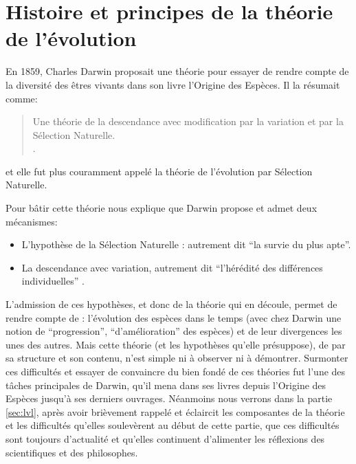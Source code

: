 

\section{Histoire et principes de la théorie de l'évolution}\label{sec:cmpdr}

En 1859, Charles Darwin proposait une théorie pour essayer de rendre compte de la diversité des êtres vivants dans son livre l'Origine des Espèces\nocite{darwin1859originspeciesbymeansnaturalselectionorpreservationfavouredracesstrugglelife}. Il la résumait comme:
\begin{quote}
	Une théorie de la descendance avec modification par la variation et par la Sélection Naturelle.\\
	\cite[dernière édition, trad. \cite{gayon1991darwinetlapresdarwin}]{darwin1859originspeciesbymeansnaturalselectionorpreservationfavouredracesstrugglelife}.
\end{quote}
et elle fut plus couramment appelé la théorie de l'évolution par Sélection Naturelle.

Pour bâtir cette théorie \cite{gayon1991darwinetlapresdarwin} nous explique que Darwin propose et admet deux mécanismes:
\begin{itemize}
	\item L'hypothèse de la Sélection Naturelle : autrement dit ``la survie du plus apte''.
	\item La descendance avec variation, autrement dit ``l'hérédité des différences individuelles'' \citep{gayon1991darwinetlapresdarwin}.
\end{itemize}

L'admission de ces hypothèses, et donc de la théorie qui en découle, permet de rendre compte de : l'évolution des espèces dans le temps (avec chez Darwin une notion de ``progression'', ``d'amélioration'' des espèces) et de leur divergences les unes des autres. Mais cette théorie (et les hypothèses qu'elle présuppose), de par sa structure et son contenu, n'est simple ni à observer ni à démontrer. Surmonter ces difficultés et essayer de convaincre du bien fondé de ces théories fut l'une des tâches principales de Darwin, qu'il mena dans ses livres depuis l'Origine des Espèces jusqu'à ses derniers ouvrages. Néanmoins nous verrons dans la partie \ref{sec:lvl}, après avoir brièvement rappelé et éclaircit les composantes de la théorie et les difficultés qu'elles soulevèrent au début de cette partie, que ces difficultés sont toujours d'actualité et qu'elles continuent d'alimenter les réflexions des scientifiques et des philosophes. 

